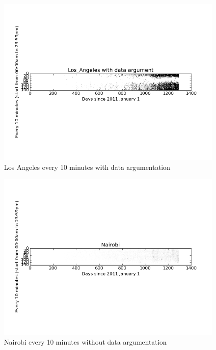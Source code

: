 \documentclass[a4paper,12pt]{article}
\begin{document}
 \begin{figure}[H]
  \begin{center}
      \includegraphics[scale=0.8]{1Los_Angelesbinary.png}
\end{center}
\caption{Los Angeles every 10 minutes with data argumentation}
 \label {fig:2}
 \end{figure}



 \begin{figure}[H]
  \begin{center}
      \includegraphics[scale=0.8]{1Nairobi.png}
\end{center}
\caption{Nairobi every 10 minutes without data argumentation}
 \label {fig:2}
 \end{figure}
 
\end{document}
